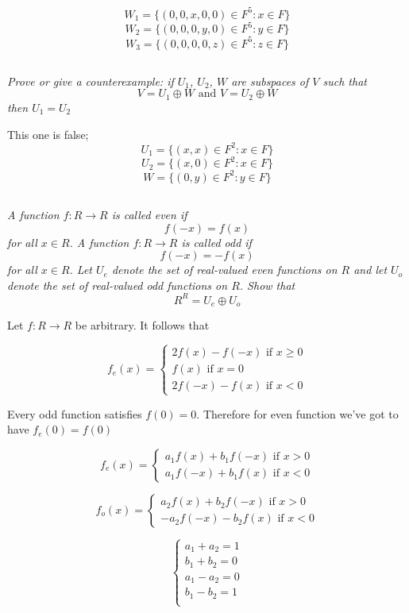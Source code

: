 \documentclass[10pt,oneside,titlepage]{book}
\begin{document}
$$W_1 = \{(0, 0, x, 0, 0) \in F^5: x \in F\}$$
$$W_2 = \{(0, 0, 0, y, 0) \in F^5: y \in F\}$$
$$W_3 = \{(0, 0, 0, 0, z) \in F^5: z \in F\}$$

\subsection{}

\textit{Prove or give a counterexample: if $U_1$, $U_2$, $W$ are subspaces
  of $V$ such that }
$$ V = U_1 \oplus W \text{ and } V = U_2 \oplus W $$
\textit{then $U_1 = U_2$}

This one is false;
$$U_1 = \{(x, x) \in F^2: x \in F\}$$
$$U_2 = \{(x, 0) \in F^2: x \in F\}$$
$$W = \{(0, y) \in F^2: y \in F\}$$

\subsection{}

\textit{A function $f: R \to R$ is called even if }
$$f(-x) = f(x)$$
\textit{for all $x \in R$. A function $f: R \to R$ is called odd if }
$$f(-x) = -f(x)$$
\textit{for all $x \in R$. Let $U_e$ denote the set of real-valued
  even functions on $R$ and let $U_o$ denote the set of real-valued odd
  functions on $R$. Show that }
$$R^R = U_e \oplus U_o$$



Let $f: R \to R$ be arbitrary. It follows that

$$f_e(x) =
\begin{cases}
  2 f(x) - f(-x) \text{ if } x \geq 0 \\
  f(x) \text{ if } x = 0 \\
  2 f(-x) - f(x) \text{ if } x < 0
\end{cases}
$$

Every odd function satisfies $f(0) = 0$.
Therefore for even function we've got to have $f_e(0) = f(0)$


$$
f_e(x) =
\begin{cases}
  a_1 f(x) + b_1 f(-x) \text{ if } x > 0 \\
  a_1 f(-x) + b_1 f(x) \text{ if } x < 0
\end{cases}
$$

$$
f_o(x) =
\begin{cases}
  a_2 f(x) + b_2 f(-x) \text{ if } x > 0 \\
  -a_2 f(-x) - b_2 f(x)  \text{ if } x < 0
\end{cases}
$$

$$
\begin{cases}
  a_1 + a_2 = 1 \\
  b_1 + b_2 = 0 \\
  a_1 - a_2 = 0 \\
  b_1 - b_2 = 1 \\
\end{cases}
$$
\end{document}
